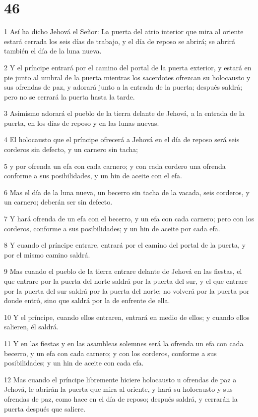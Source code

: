\chapter{46}

\par 1 Así ha dicho Jehová el Señor: La puerta del atrio interior que mira al oriente estará cerrada los seis días de trabajo, y el día de reposo se abrirá; se abrirá también el día de la luna nueva.
\par 2 Y el príncipe entrará por el camino del portal de la puerta exterior, y estará en pie junto al umbral de la puerta mientras los sacerdotes ofrezcan su holocausto y sus ofrendas de paz, y adorará junto a la entrada de la puerta; después saldrá; pero no se cerrará la puerta hasta la tarde.
\par 3 Asimismo adorará el pueblo de la tierra delante de Jehová, a la entrada de la puerta, en los días de reposo y en las lunas nuevas.
\par 4 El holocausto que el príncipe ofrecerá a Jehová en el día de reposo será seis corderos sin defecto, y un carnero sin tacha;
\par 5 y por ofrenda un efa con cada carnero; y con cada cordero una ofrenda conforme a sus posibilidades, y un hin de aceite con el efa.
\par 6 Mas el día de la luna nueva, un becerro sin tacha de la vacada, seis corderos, y un carnero; deberán ser sin defecto.
\par 7 Y hará ofrenda de un efa con el becerro, y un efa con cada carnero; pero con los corderos, conforme a sus posibilidades; y un hin de aceite por cada efa.
\par 8 Y cuando el príncipe entrare, entrará por el camino del portal de la puerta, y por el mismo camino saldrá.
\par 9 Mas cuando el pueblo de la tierra entrare delante de Jehová en las fiestas, el que entrare por la puerta del norte saldrá por la puerta del sur, y el que entrare por la puerta del sur saldrá por la puerta del norte; no volverá por la puerta por donde entró, sino que saldrá por la de enfrente de ella.
\par 10 Y el príncipe, cuando ellos entraren, entrará en medio de ellos; y cuando ellos salieren, él saldrá.
\par 11 Y en las fiestas y en las asambleas solemnes será la ofrenda un efa con cada becerro, y un efa con cada carnero; y con los corderos, conforme a sus posibilidades; y un hin de aceite con cada efa.
\par 12 Mas cuando el príncipe libremente hiciere holocausto u ofrendas de paz a Jehová, le abrirán la puerta que mira al oriente, y hará su holocausto y sus ofrendas de paz, como hace en el día de reposo; después saldrá, y cerrarán la puerta después que saliere.
